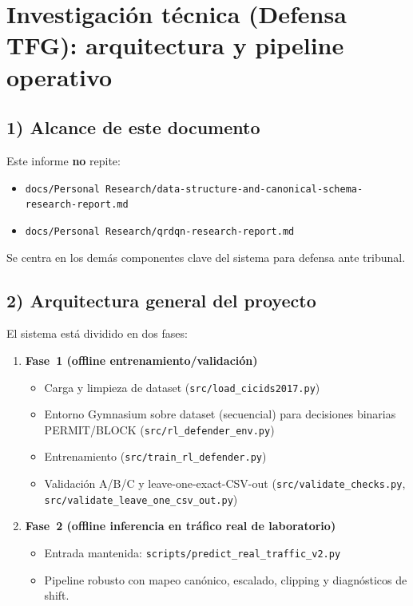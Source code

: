 ﻿\documentclass[12pt,a4paper]{article}
\begin{document}
\section{Investigación técnica (Defensa TFG): arquitectura y pipeline operativo}

\subsection{1) Alcance de este documento}

Este informe \textbf{no} repite:

\begin{itemize}
  \item \verb|docs/Personal Research/data-structure-and-canonical-schema-research-report.md|
  \item \verb|docs/Personal Research/qrdqn-research-report.md|
\end{itemize}

Se centra en los demás componentes clave del sistema para defensa ante tribunal.

\subsection{2) Arquitectura general del proyecto}

El sistema está dividido en dos fases:

\begin{enumerate}
  \item \textbf{Fase~1 (offline entrenamiento/validación)}
    \begin{itemize}
      \item Carga y limpieza de dataset (\verb|src/load_cicids2017.py|)
      \item Entorno Gymnasium sobre dataset (secuencial) para decisiones binarias PERMIT/BLOCK
            (\verb|src/rl_defender_env.py|)
      \item Entrenamiento (\verb|src/train_rl_defender.py|)
      \item Validación A/B/C y leave-one-exact-CSV-out (\verb|src/validate_checks.py|,
            \verb|src/validate_leave_one_csv_out.py|)
    \end{itemize}
  \item \textbf{Fase~2 (offline inferencia en tráfico real de laboratorio)}
    \begin{itemize}
      \item Entrada mantenida: \verb|scripts/predict_real_traffic_v2.py|
      \item Pipeline robusto con mapeo canónico, escalado, clipping y diagnósticos de shift.
    \end{itemize}
\end{enumerate}
\end{document}

